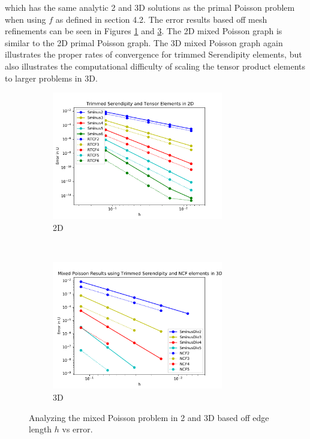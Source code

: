 \documentclass[manuscript,screen]{acmart}
\begin{document}
\noindent which has the same analytic 2 and 3D solutions as the primal Poisson problem when using $f$ as defined in section 4.2.  The error results based off mesh refinements can be seen in Figures \ref{fig:2dMixedPoissonH} and \ref{fig:3dMixedPoissonH}.  The 2D mixed Poisson graph is similar to the 2D primal Poisson graph.  The 3D mixed Poisson graph again illustrates the proper rates of convergence for trimmed Serendipity elements, but also illustrates the computational difficulty of scaling the tensor product elements to larger problems in 3D.

\begin{figure}[h!]
  \centering
  \begin{subfigure}[h]{0.5\textwidth}
    \centering
    \includegraphics[height=2.2in]{2dMixedPoissonH.pdf}
    \caption{2D}
    \label{fig:2dMixedPoissonH}
  \end{subfigure}
  ~
  \begin{subfigure}[h]{0.5\textwidth}
    \centering
    \includegraphics[height=2.2in]{3dMixedPoissonH.pdf}
    \caption{3D}
    \label{fig:3dMixedPoissonH}
  \end{subfigure}
  \caption{Analyzing the mixed Poisson problem in 2 and 3D based off edge length $h$ vs error.}
\end{figure} 

\end{document}
